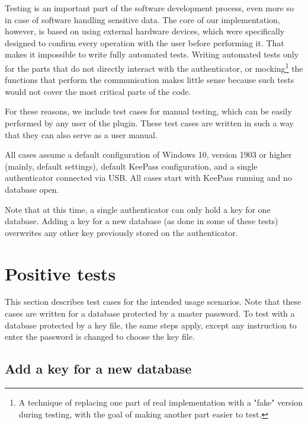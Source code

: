 Testing is an important part of the software development process, even more so in case
of software handling sensitive data. The core of our implementation, however, is based
on using external hardware devices, which were specifically designed to confirm every
operation with the user before performing it. That makes it impossible to write fully
automated tests. Writing automated tests only for the parts that do not directly interact
with the authenticator, or mocking\footnote{A technique of replacing one part of real
implementation with a "fake" version during testing, with the goal of making another
part easier to test.} the functions that perform the communication makes little sense
because such tests would not cover the most critical parts of the code.

For these reasons, we include test cases for manual testing, which can be easily
performed by any user of the plugin. These test cases are written in such a way that
they can also serve as a user manual.

All cases assume a default configuration of Windows 10, version 1903 or higher (mainly, default  settings),
default KeePass configuration, and a single authenticator connected via USB. All cases start with KeePass running and no database open.

Note that at this time, a single authenticator can only hold a key for one database.
Adding a key for a new database (as done in some of these tests) overwrites any other
key previously stored on the authenticator.


\section{Positive tests}\label{sec:positive-tests}

This section describes test cases for the intended usage scenarios.
Note that these cases are written for a database protected by a master password. To test with a database
protected by a key file, the same steps apply, except any instruction to enter the password
is changed to choose the key file.

\subsection{Add a key for a new database}\label{subsec:add-a-key-for-a-new-database}

